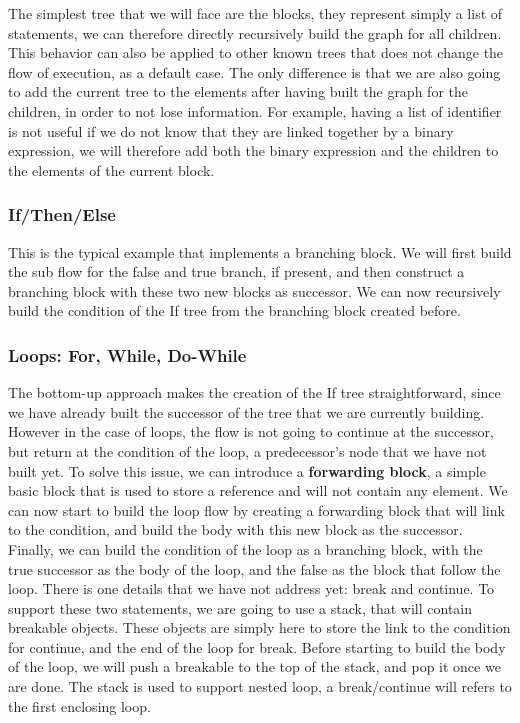 The simplest tree that we will face are the blocks, they represent simply a list of statements, we can therefore directly recursively build the graph for all children. 
This behavior can also be applied to other known trees that does not change the flow of execution, as a default case. 
The only difference is that we are also going to add the current tree to the elements after having built the graph for the children, in order to not lose information. 
For example, having a list of identifier is not useful if we do not know that they are linked together by a binary expression, we will therefore add both the binary expression and the children to the elements of the current block.

\subsubsection{If/Then/Else}
\label{subsubsec:if_then_else}

This is the typical example that implements a branching block. 
We will first build the sub flow for the false and true branch, if present, and then construct a branching block with these two new blocks as successor. 
We can now recursively build the condition of the If tree from the branching block created before.

\subsubsection{Loops: For, While, Do-While}
\label{subsubsec:loops_cfg}

The bottom-up approach makes the creation of the If tree straightforward, since we have already built the successor of the tree that we are currently building. 
However in the case of loops, the flow is not going to continue at the successor, but return at the condition of the loop, a predecessor’s node that we have not built yet. 
To solve this issue, we can introduce a \textbf{forwarding block}, a simple basic block that is used to store a reference and will not contain any element. 
We can now start to build the loop flow by creating a forwarding block that will link to the condition, and build the body with this new block as the successor. 
Finally, we can build the condition of the loop as a branching block, with the true successor as the body of the loop, and the false as the block that follow the loop.
There is one details that we have not address yet: break and continue. 
To support these two statements, we are going to use a stack, that will contain breakable objects. These objects are simply here to store the link to the condition for continue, and the end of the loop for break. 
Before starting to build the body of the loop, we will push a breakable to the top of the stack, and pop it once we are done. 
The stack is used to support nested loop, a break/continue will refers to the first enclosing loop.

